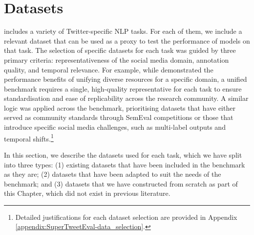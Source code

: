 \begin{table}[t]
  \caption{Example input and output for each and dataset included in {\DATASET}.}
  \label{tab:SuperTweetEval-examples}
  \end{table}
  \clearpage

\section{Datasets}
{\DATASET} includes a variety of Twitter-specific NLP tasks. For each of them, we include a relevant dataset that can be used as a proxy to test the performance of models on that task. The selection of specific datasets for each task was guided by three primary criteria: representativeness of the social media domain, annotation quality, and temporal relevance. For example, while  demonstrated the performance benefits of unifying diverse resources for a specific domain, a unified benchmark requires a single, high-quality representative for each task to ensure standardisation and ease of replicability across the research community. A similar logic was applied across the benchmark, prioritising datasets that have either served as community standards through SemEval competitions or those that introduce specific social media challenges, such as multi-label outputs and temporal shifts.\footnote{Detailed justifications for each dataset selection are provided in Appendix \ref{appendix:SuperTweetEval-data_selection}.}

In this section, we describe the datasets used for each task, which we have split into three types: (1) existing datasets that have been included in the benchmark as they are; (2) datasets that have been adapted to suit the needs of the benchmark; and (3) datasets that we have constructed from scratch as part of this Chapter, which did not exist in previous literature. 


